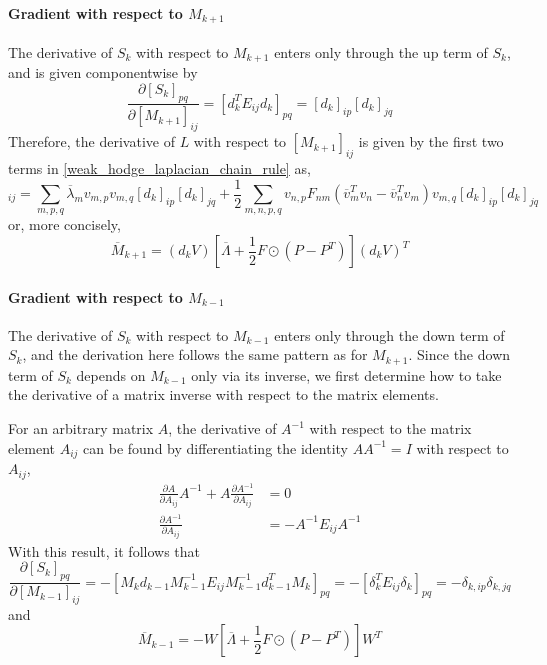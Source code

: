 \documentclass[11pt, a4paper]{article}
\begin{document}
\paragraph{Gradient with respect to $M_{k+1}$}
The derivative of $S_k$ with respect to $M_{k+1}$ enters only through the up term of $S_k$, and is given componentwise by
\begin{equation}
\frac{\partial [S_k]_{pq}}{\partial [M_{k+1}]_{ij}} = [d_k^TE_{ij}d_k]_{pq} = [d_k]_{ip}[d_k]_{jq}
\end{equation}
Therefore, the derivative of $L$ with respect to $[M_{k+1}]_{ij}$ is given by the first two terms in \eqref{weak_hodge_laplacian_chain_rule} as,
\begin{equation}
    [\overline M_{k+1}]_{ij} = \sum_{m,p,q} \overline \lambda_m v_{m,p}v_{m,q}[d_k]_{ip}[d_k]_{jq} + \frac 1 2 \sum_{m,n,p,q} v_{n,p}F_{nm}(\overline v_m^Tv_n - \overline v_n^Tv_m)v_{m,q}[d_k]_{ip}[d_k]_{jq}
\end{equation}
or, more concisely,
\begin{equation}
\boxed{
    \overline M_{k+1} = (d_k V)\left[\overline\Lambda + \frac 1 2 F \odot (P - P^T)\right](d_k V)^T
}
\label{M_kp1_sensitivity}
\end{equation}

\paragraph{Gradient with respect to $M_{k-1}$}
The derivative of $S_k$ with respect to $M_{k-1}$ enters only through the down term of $S_k$, and the derivation here follows the same pattern as for $M_{k+1}$. Since the down term of $S_k$ depends on $M_{k-1}$ only via its inverse, we first determine how to take the derivative of a matrix inverse with respect to the matrix elements.

For an arbitrary matrix $A$, the derivative of $A^{-1}$ with respect to the matrix element $A_{ij}$ can be found by differentiating the identity $AA^{-1}=I$ with respect to $A_{ij}$,
\begin{equation}
\begin{aligned}
    \frac{\partial A}{\partial A_{ij}}A^{-1} + A\frac{\partial A^{-1}}{\partial A_{ij}} & = 0 \\
    \frac{\partial A^{-1}}{\partial A_{ij}} &= -A^{-1}E_{ij}A^{-1}
\end{aligned}
\end{equation}
With this result, it follows that
\begin{equation}
    \frac{\partial [S_k]_{pq}}{\partial [M_{k-1}]_{ij}} = -[M_k d_{k-1}M_{k-1}^{-1}E_{ij}M_{k-1}^{-1}d_{k-1}^TM_k]_{pq} = -[\delta_k^TE_{ij}\delta_k]_{pq} = -\delta_{k,ip}\delta_{k,jq}
\end{equation}
and
\begin{equation}
\boxed{
    \overline M_{k-1} = -W\left[\overline\Lambda + \frac 1 2 F \odot (P - P^T)\right]W^T
}
\end{equation}
\end{document}
